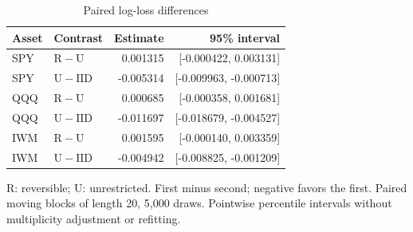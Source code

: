 \begin{table}[!htbp]\centering\small\setlength{\tabcolsep}{10pt}
\caption{Paired log-loss differences}\label{tab:intervals}
\begin{tabular}{llrr}\toprule
Asset & Contrast & Estimate & 95\% interval\\\midrule
SPY & \mbox{$\mathrm{R}-\mathrm{U}$} & 0.001315 & [-0.000422, 0.003131]\\
SPY & \mbox{$\mathrm{U}-\mathrm{IID}$} & -0.005314 & [-0.009963, -0.000713]\\
QQQ & \mbox{$\mathrm{R}-\mathrm{U}$} & 0.000685 & [-0.000358, 0.001681]\\
QQQ & \mbox{$\mathrm{U}-\mathrm{IID}$} & -0.011697 & [-0.018679, -0.004527]\\
IWM & \mbox{$\mathrm{R}-\mathrm{U}$} & 0.001595 & [-0.000140, 0.003359]\\
IWM & \mbox{$\mathrm{U}-\mathrm{IID}$} & -0.004942 & [-0.008825, -0.001209]\\
\bottomrule\end{tabular}
\par\smallskip\parbox{0.98\linewidth}{\footnotesize R: reversible; U: unrestricted. First minus second; negative favors the first. Paired moving blocks of length 20, 5,000 draws. Pointwise percentile intervals without multiplicity adjustment or refitting.}
\end{table}

